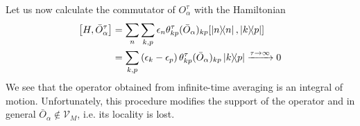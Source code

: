 Let us now calculate the commutator of \(O_{\alpha}^{\tau}\) with the Hamiltonian
\begin{align}
    \comm{H}{\bar{O}_{\alpha}^{\tau}} & = \sum_n \sum_{k,p} \epsilon_n \theta_{kp}^{\tau} (\bar{O}_{\alpha})_{kp} \comm{ \ketbra{n}{n}}{ \ketbra{k}{p}} \nonumber         \\
                             & = \sum_{k,p} \left(\epsilon_k-\epsilon_p\right) \theta_{kp}^{\tau} (\bar{O}_{\alpha})_{kp} \ketbra{k}{p} \xrightarrow{\tau \to \infty} 0 
        \label{eq:time_averaged_commutator}
\end{align}
We see that the operator obtained from infinite-time averaging is an integral of motion. Unfortunately,
this procedure modifies the support of the operator and in general \(\bar{O}_{\alpha} \not\in \mathcal{V}_M\), i.e. its locality is lost.

